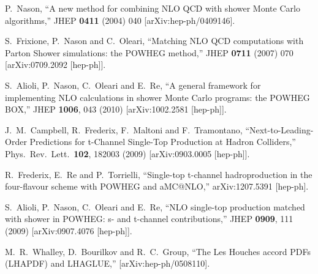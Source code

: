 \documentclass[paper]{JHEP3}
\begin{document}
\begin{thebibliography}{10}

  P.~Nason,
  ``A new method for combining NLO QCD with shower Monte Carlo algorithms,''
  JHEP {\bf 0411} (2004) 040
  [arXiv:hep-ph/0409146].

  S.~Frixione, P.~Nason and C.~Oleari,
``Matching NLO QCD computations with Parton Shower simulations: the POWHEG
method,''
  JHEP {\bf 0711} (2007) 070
  [arXiv:0709.2092 [hep-ph]].

  S.~Alioli, P.~Nason, C.~Oleari and E.~Re,
``A general framework for implementing NLO calculations in shower Monte Carlo
programs: the POWHEG BOX,''
  JHEP {\bf 1006}, 043 (2010)
  [arXiv:1002.2581 [hep-ph]].

  J.~M.~Campbell, R.~Frederix, F.~Maltoni and F.~Tramontano,
``Next-to-Leading-Order Predictions for t-Channel Single-Top Production at Hadron Colliders,''
  Phys.\ Rev.\ Lett.\  {\bf 102}, 182003 (2009)
  [arXiv:0903.0005 [hep-ph]].

  R.~Frederix, E.~Re and P.~Torrielli,
``Single-top t-channel hadroproduction in the four-flavour scheme with POWHEG and aMC@NLO,''
  arXiv:1207.5391 [hep-ph].

  S.~Alioli, P.~Nason, C.~Oleari and E.~Re,
  ``NLO single-top production matched with shower in POWHEG: s- and t-channel
  contributions,''
  JHEP {\bf 0909}, 111 (2009)
  [arXiv:0907.4076 [hep-ph]].

  M.~R.~Whalley, D.~Bourilkov and R.~C.~Group,
``The Les Houches accord PDFs (LHAPDF) and LHAGLUE,''
  [arXiv:hep-ph/0508110].

\end{thebibliography}
\end{document}
